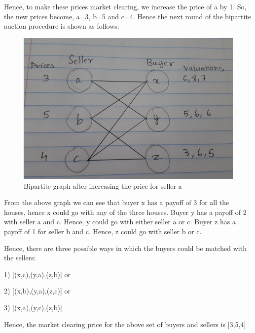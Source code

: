 \documentclass[twoside]{report}
\begin{document}
Hence, to make these prices market clearing, we increase the price of a by 1. So, the new prices become, a=3, b=5 and c=4. Hence the next round of the bipartite auction procedure is shown as follows:

\begin{figure}[htp]
\includegraphics{q7_2}
\centering
\caption{Bipartite graph after increasing the price for seller a}
\end{figure}

From the above graph we can see that buyer x has a payoff of 3 for all the houses, hence x could go with any of the three houses.
Buyer y has a payoff of 2 with seller a and c. Hence, y could go with either seller a or c. Buyer z has a payoff of 1 for seller b and c. Hence, z could go with seller b or c.

Hence, there are three possible ways in which the buyers could be matched with the sellers:
 
 1)  [(x,c),(y,a),(z,b)] or
 
 2)  [(x,b),(y,a),(z,c)] or
 
 3)  [(x,a),(y,c),(z,b)]
 
 Hence, the market clearing price for the above set of buyers and sellers is [3,5,4]
\end{document}
